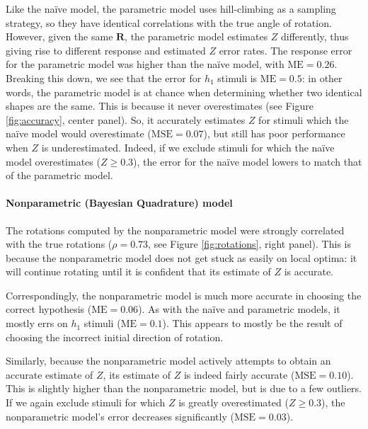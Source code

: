 \documentclass{article} %
\newcommand{\MSE}[0]{\mathrm{MSE}}
\newcommand{\ME}[0]{\mathrm{ME}}
\newcommand{\naive}[0]{na\"ive}
\begin{document}
Like the \naive{} model, the parametric model uses hill-climbing as a
sampling strategy, so they have identical correlations with the true
angle of rotation. However, given the same $\mathbf{R}$, the
parametric model estimates $Z$ differently, thus giving rise to
different response and estimated $Z$ error rates. The response error
for the parametric model was higher than the \naive{} model, with
$\ME{}=0.26$. Breaking this down, we see that the error for $h_1$
stimuli is $\ME{}=0.5$: in other words, the parametric model is at
chance when determining whether two identical shapes are the
same. This is because it never overestimates (see Figure
\ref{fig:accuracy}, center panel). So, it accurately estimates $Z$ for
stimuli which the \naive{} model would overestimate ($\MSE{}=0.07$),
but still has poor performance when $Z$ is underestimated. Indeed, if
we exclude stimuli for which the \naive{} model overestimates ($Z\geq
0.3$), the error for the \naive{} model lowers to match that of the
parametric model.

\paragraph{Nonparametric (Bayesian Quadrature) model}

The rotations computed by the nonparametric model were strongly
correlated with the true rotations ($\rho=0.73$, see Figure
\ref{fig:rotations}, right panel). This is because the nonparametric
model does not get stuck as easily on local optima: it will continue
rotating until it is confident that its estimate of $Z$ is accurate. 

Correspondingly, the nonparametric model is much more accurate in
choosing the correct hypothesis ($\ME{}=0.06$). As with the \naive{}
and parametric models, it mostly errs on $h_1$ stimuli
($\ME{}=0.1$). This appears to mostly be the result of choosing the
incorrect initial direction of rotation.

Similarly, because the nonparametric model actively attempts to obtain
an accurate estimate of $Z$, its estimate of $Z$ is indeed fairly
accurate ($\MSE{}=0.10$). This is slightly higher than the
nonparametric model, but is due to a few outliers. If we again exclude
stimuli for which $Z$ is greatly overestimated ($Z\geq 0.3$), the
nonparametric model's error decreases significantly ($\MSE{}=0.03$).
\end{document}
